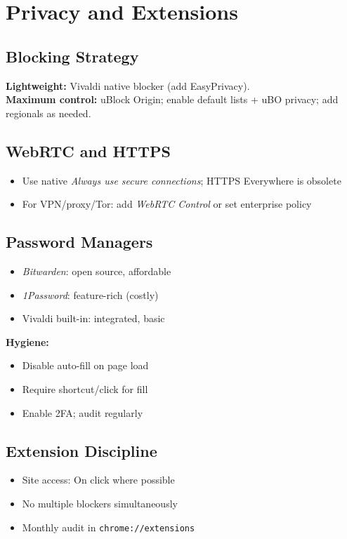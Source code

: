 \documentclass[10pt,a4paper,oneside]{book}
\newcommand{\keystroke}[1]{\texttt{\color{accentred}#1}}
\newcommand{\extension}[1]{\textit{\color{accentred}#1}}
\begin{document}
\chapter{Privacy and Extensions}
\section{Blocking Strategy}
\textbf{Lightweight:} Vivaldi native blocker (add EasyPrivacy).\\
\textbf{Maximum control:} uBlock Origin; enable default lists + uBO privacy; add regionals as needed.

\section{WebRTC and HTTPS}
\begin{itemize}
  \item Use native \textit{Always use secure connections}; HTTPS Everywhere is obsolete
  \item For VPN/proxy/Tor: add \extension{WebRTC Control} or set enterprise policy
\end{itemize}

\section{Password Managers}
\begin{multicols}{2}
\begin{itemize}
  \item \extension{Bitwarden}: open source, affordable
  \item \extension{1Password}: feature-rich (costly)
  \item Vivaldi built-in: integrated, basic
\end{itemize}
\columnbreak
\textbf{Hygiene:}
\begin{itemize}
  \item Disable auto-fill on page load
  \item Require shortcut/click for fill
  \item Enable 2FA; audit regularly
\end{itemize}
\end{multicols}

\section{Extension Discipline}
\begin{itemize}
  \item Site access: On click where possible
  \item No multiple blockers simultaneously
  \item Monthly audit in \keystroke{chrome://extensions}
\end{itemize}
\end{document}
